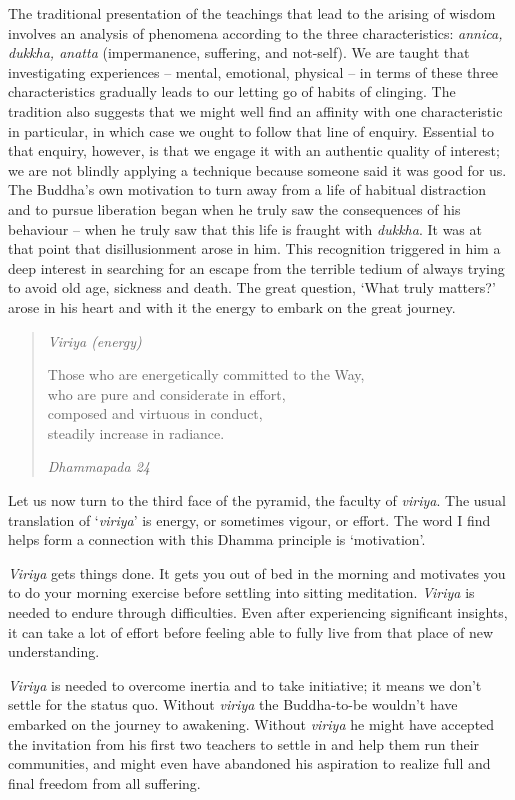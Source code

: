 The traditional presentation of the teachings that lead to the arising
of wisdom involves an analysis of phenomena according to the three
characteristics: \emph{annica, dukkha, anatta} (impermanence, suffering,
and not-self). We are taught that investigating experiences -- mental,
emotional, physical -- in terms of these three characteristics gradually
leads to our letting go of habits of clinging. The tradition also
suggests that we might well find an affinity with one characteristic in
particular, in which case we ought to follow that line of enquiry.
Essential to that enquiry, however, is that we engage it with an
authentic quality of interest; we are not blindly applying a technique
because someone said it was good for us. The Buddha's own motivation to
turn away from a life of habitual distraction and to pursue liberation
began when he truly saw the consequences of his behaviour -- when he
truly saw that this life is fraught with \emph{dukkha}. It was at that
point that disillusionment arose in him. This recognition triggered in
him a deep interest in searching for an escape from the terrible tedium
of always trying to avoid old age, sickness and death. The great
question, `What truly matters?' arose in his heart and with it the
energy to embark on the great journey.

\begin{quote}
  \emph{Viriya (energy)}

  Those who are energetically committed to the Way,\\
  who are pure and considerate in effort,\\
  composed and virtuous in conduct,\\
  steadily increase in radiance.

  \emph{Dhammapada 24}
\end{quote}

Let us now turn to the third face of the pyramid, the faculty of
\emph{viriya}. The usual translation of `\emph{viriya}' is
energy, or sometimes vigour, or effort. The word I find helps form a
connection with this Dhamma principle is `motivation'.

\emph{Viriya} gets things done. It gets you out of bed in the morning
and motivates you to do your morning exercise before settling into
sitting meditation. \emph{Viriya} is needed to endure through
difficulties. Even after experiencing significant insights, it can take
a lot of effort before feeling able to fully live from that place of new
understanding.

\emph{Viriya} is needed to overcome inertia and to take initiative; it
means we don't settle for the status quo. Without \emph{viriya} the
Buddha-to-be wouldn't have embarked on the journey to awakening. Without
\emph{viriya} he might have accepted the invitation from his first two
teachers to settle in and help them run their communities, and might
even have abandoned his aspiration to realize full and final freedom
from all suffering.

